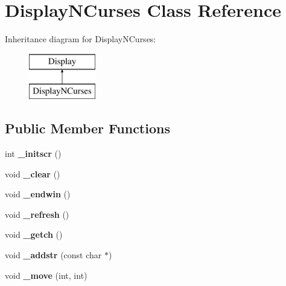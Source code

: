 \hypertarget{class_display_n_curses}{\section{Display\+N\+Curses Class Reference}
\label{class_display_n_curses}
}
Inheritance diagram for Display\+N\+Curses\+:\begin{figure}[H]
\begin{center}
\leavevmode
\includegraphics[height=2.000000cm]{class_display_n_curses}
\end{center}
\end{figure}
\subsection*{Public Member Functions}
\begin{DoxyCompactItemize}
\item 
\hypertarget{class_display_n_curses_a0cb29e78f2d3c19ef765739fc5481b23}{int {\bfseries \+\_\+initscr} ()}\label{class_display_n_curses_a0cb29e78f2d3c19ef765739fc5481b23}

\item 
\hypertarget{class_display_n_curses_a5874b9f4c6acc9d44c1de6813502bc31}{void {\bfseries \+\_\+clear} ()}\label{class_display_n_curses_a5874b9f4c6acc9d44c1de6813502bc31}

\item 
\hypertarget{class_display_n_curses_aab07a991fb72a70cabd8094d3b55cf5d}{void {\bfseries \+\_\+endwin} ()}\label{class_display_n_curses_aab07a991fb72a70cabd8094d3b55cf5d}

\item 
\hypertarget{class_display_n_curses_aa585c411a9b2e5e7d44903c7b86dbaa6}{void {\bfseries \+\_\+refresh} ()}\label{class_display_n_curses_aa585c411a9b2e5e7d44903c7b86dbaa6}

\item 
\hypertarget{class_display_n_curses_a0bddd32732caa6adf88c542ede448de9}{void {\bfseries \+\_\+getch} ()}\label{class_display_n_curses_a0bddd32732caa6adf88c542ede448de9}

\item 
\hypertarget{class_display_n_curses_a472957f2e0b2b2dcc056e5f1e741dc94}{void {\bfseries \+\_\+addstr} (const char $\ast$)}\label{class_display_n_curses_a472957f2e0b2b2dcc056e5f1e741dc94}

\item 
\hypertarget{class_display_n_curses_ab4ed85272039524b5a7273d7575d6aec}{void {\bfseries \+\_\+move} (int, int)}\label{class_display_n_curses_ab4ed85272039524b5a7273d7575d6aec}

\end{DoxyCompactItemize}


